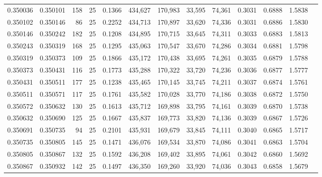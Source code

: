 \begin{tabular}{rrrrrrrrrrrrr}
0.350036 & 0.350101 &   158 &  25 &                                     0.1366 & 434,627 & 170,983 &  33,595 &  74,361 & 0.3031 & 0.6888 & 1.5838 \\
0.350102 & 0.350146 &    86 &  25 &                                     0.2252 & 434,713 & 170,897 &  33,620 &  74,336 & 0.3031 & 0.6886 & 1.5830 \\
0.350146 & 0.350242 &   182 &  25 &                                     0.1208 & 434,895 & 170,715 &  33,645 &  74,311 & 0.3033 & 0.6883 & 1.5813 \\
0.350243 & 0.350319 &   168 &  25 &                                     0.1295 & 435,063 & 170,547 &  33,670 &  74,286 & 0.3034 & 0.6881 & 1.5798 \\
0.350319 & 0.350373 &   109 &  25 &                                     0.1866 & 435,172 & 170,438 &  33,695 &  74,261 & 0.3035 & 0.6879 & 1.5788 \\
0.350373 & 0.350431 &   116 &  25 &                                     0.1773 & 435,288 & 170,322 &  33,720 &  74,236 & 0.3036 & 0.6877 & 1.5777 \\
0.350431 & 0.350511 &   177 &  25 &                                     0.1238 & 435,465 & 170,145 &  33,745 &  74,211 & 0.3037 & 0.6874 & 1.5761 \\
0.350511 & 0.350571 &   117 &  25 &                                     0.1761 & 435,582 & 170,028 &  33,770 &  74,186 & 0.3038 & 0.6872 & 1.5750 \\
0.350572 & 0.350632 &   130 &  25 &                                     0.1613 & 435,712 & 169,898 &  33,795 &  74,161 & 0.3039 & 0.6870 & 1.5738 \\
0.350632 & 0.350690 &   125 &  25 &                                     0.1667 & 435,837 & 169,773 &  33,820 &  74,136 & 0.3039 & 0.6867 & 1.5726 \\
0.350691 & 0.350735 &    94 &  25 &                                     0.2101 & 435,931 & 169,679 &  33,845 &  74,111 & 0.3040 & 0.6865 & 1.5717 \\
0.350735 & 0.350805 &   145 &  25 &                                     0.1471 & 436,076 & 169,534 &  33,870 &  74,086 & 0.3041 & 0.6863 & 1.5704 \\
0.350805 & 0.350867 &   132 &  25 &                                     0.1592 & 436,208 & 169,402 &  33,895 &  74,061 & 0.3042 & 0.6860 & 1.5692 \\
0.350867 & 0.350932 &   142 &  25 &                                     0.1497 & 436,350 & 169,260 &  33,920 &  74,036 & 0.3043 & 0.6858 & 1.5679 \\

\end{tabular}

